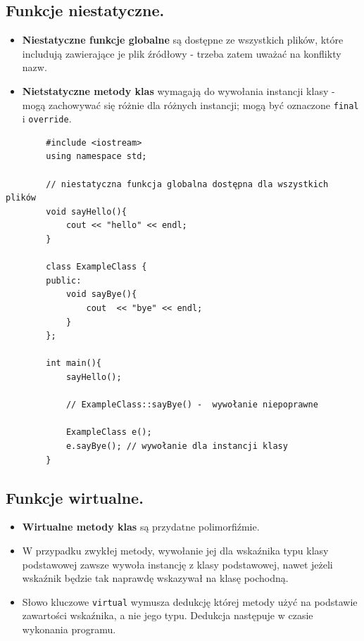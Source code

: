 \documentclass[12pt]{article}
\begin{document}
    \subsection{Funkcje niestatyczne.}
    \begin{itemize}
        \item \textbf{Niestatyczne funkcje globalne} są dostępne ze wszystkich plików, które includują zawierające
        je plik źródłowy - trzeba zatem uważać na konflikty nazw.
        \item \textbf{Nietstatyczne metody klas} wymagają do wywołania instancji klasy - mogą zachowywać się różnie
        dla różnych instancji; mogą być oznaczone \texttt{final} i \texttt{override}.
    \end{itemize}

    \begin{verbatim}
        #include <iostream>
        using namespace std;

        // niestatyczna funkcja globalna dostępna dla wszystkich plików
        void sayHello(){
            cout << "hello" << endl;
        }

        class ExampleClass {
        public:
            void sayBye(){
                cout  << "bye" << endl;
            }
        };

        int main(){
            sayHello();

            // ExampleClass::sayBye() -  wywołanie niepoprawne

            ExampleClass e();
            e.sayBye(); // wywołanie dla instancji klasy
        }
    \end{verbatim}

    \subsection{Funkcje wirtualne.}
    \begin{itemize}
        \item \textbf{Wirtualne metody klas} są przydatne polimorfiźmie.
        \item W przypadku zwykłej metody, wywołanie jej dla wskaźnika typu klasy podstawowej zawsze wywoła instancję
        z klasy podstawowej, nawet jeżeli wskaźnik będzie tak naprawdę wskazywał na klasę pochodną.
        \item Słowo kluczowe \texttt{virtual} wymusza dedukcję której metody użyć na podstawie zawartości wskaźnika,
        a nie jego typu. Dedukcja następuje w czasie wykonania programu.
    \end{itemize}
\end{document}
